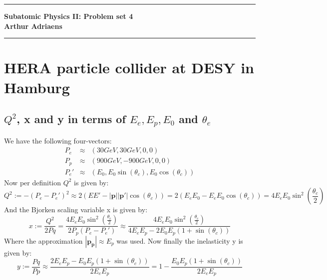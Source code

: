 \documentclass[10pt,a4paper,twoside]{article}
\begin{document}
	\begin{center}
		\hrule
		\vspace{.4cm}
		{\bf {\huge Subatomic Physics II: Problem set 4}}
		\vspace{.2cm}
		\\
		{\bf Arthur Adriaens}
		\vspace{.2cm}
		\hrule
	\end{center}
\section*{HERA particle collider at DESY in Hamburg}
\subsection{$Q^2$, x and y in terms of $E_e, E_p, E_0$ and $\theta_e$ }
We have the following four-vectors:
\begin{eqnarray}
	P_e &\approx& (30GeV,30GeV,0,0)\\
	P_p &\approx& (900GeV,-900GeV,0,0)\\
	P_e' &\approx& (E_0, E_0\sin(\theta_c), E_0\cos(\theta_c))
\end{eqnarray}
Now per definition $Q^2$ is given by\cite{ParticlesAndNuclei}:
\begin{equation}
	Q^2 := -(P_e - P_e')^2 \approx 2(EE' - |\boldsymbol{p}||\boldsymbol{p'}|\cos(\theta_c)) = 2(E_eE_0 - E_eE_0\cos(\theta_c)) = 4E_eE_0\sin^2\left(\frac{\theta_c}{2}\right)
\end{equation}
And the Bjorken scaling variable x is given by:
\begin{equation}
	x := \frac{Q^2}{2Pq} = \frac{4E_eE_0\sin^2\left(\frac{\theta_c}{2}\right)}{2P_p(P_e-P_e')} \approx \frac{4E_eE_0\sin^2\left(\frac{\theta_c}{2}\right)}{4E_eE_p - 2E_0E_p(1 + \sin(\theta_c))}
\end{equation}
Where the approximation $|\boldsymbol{p_p}| \approx E_p$ was used. Now finally the inelasticity y is given by:
\begin{equation}
	y := \frac{Pq}{Pp} \approx \frac{2E_eE_p - E_0E_p(1 + \sin(\theta_c))}{2E_eE_p} = 1 - \frac{E_0E_p(1 + \sin(\theta_c))}{2E_eE_p} 
\end{equation}
\end{document}
